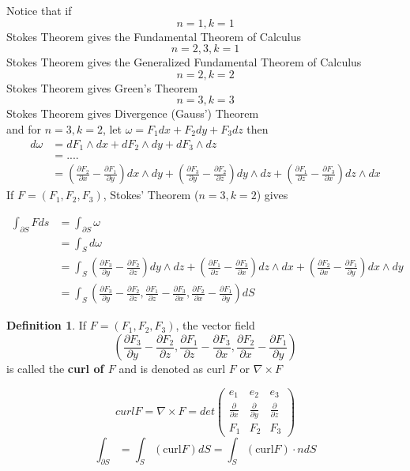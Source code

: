 \documentclass[12pt]{article}
\theoremstyle{plain}
\theoremstyle{definition}
\newtheorem{definition}[theorem]{Definition}
\begin{document}
Notice that if
$$n=1, k=1$$
Stokes Theorem gives the Fundamental Theorem of Calculus
$$n=2,3, k=1$$
Stokes Theorem gives the Generalized Fundamental Theorem of Calculus
$$n = 2, k = 2$$
Stokes Theorem gives Green's Theorem
$$n=3, k=3$$
Stokes Theorem gives Divergence (Gauss') Theorem\\
and for $n=3, k=2$, let $\omega = F_1 dx + F_2 dy + F_3 dz$ then
\begin{align*}
	d\omega &= dF_1 \wedge dx + dF_2 \wedge dy + dF_3 \wedge dz\\
	&= ....\\
	&= (\frac{\partial F_2}{\partial x} - \frac{\partial F_1}{\partial y})dx \wedge dy + (\frac{\partial F_3}{\partial y} - \frac{\partial F_2}{\partial z})dy \wedge dz + (\frac{\partial F_1}{\partial z} - \frac{\partial F_3}{\partial x})dz \wedge dx
\end{align*}
If $F=(F_1, F_2, F_3)$, Stokes' Theorem ($n=3, k=2$) gives

\begin{align*}
	\int_{\partial S} F ds &= \int_{\partial S} \omega\\
	 &= \int_S d\omega\\
	 &= \int_S (\frac{\partial F_3}{\partial y}-\frac{\partial F_2}{\partial z})dy \wedge dz + (\frac{\partial F_1}{\partial z}-\frac{\partial F_3}{\partial x})dz\wedge dx + (\frac{\partial F_2}{\partial x}-\frac{\partial F_1}{\partial y})dx\wedge dy\\
	 &= \int_S (\frac{\partial F_3}{\partial y}-\frac{\partial F_2}{\partial z}, \frac{\partial F_1}{\partial z} - \frac{\partial F_3}{\partial x}, \frac{\partial F_2}{\partial x} - \frac{\partial F_1}{\partial y})dS
\end{align*}

\begin{definition}
	If $F=(F_1, F_2, F_3)$, the vector field
	$$(\frac{\partial F_3}{\partial y}-\frac{\partial F_2}{\partial z}, \frac{\partial F_1}{\partial z} - \frac{\partial F_3}{\partial x}, \frac{\partial F_2}{\partial x} - \frac{\partial F_1}{\partial y})$$
	is called the \textbf{curl of $F$} and is denoted as curl $F$ or $\nabla \times F$
\end{definition}

$$curl F = \nabla \times F = det\begin{pmatrix}
e_1 & e_2 & e_3 \\
\frac{\partial}{\partial x} & \frac{\partial}{\partial y} & \frac{\partial}{\partial z}\\
F_1 & F_2 & F_3
\end{pmatrix}$$
$$\int_{\partial S} = \int_S (\text{curl} F)dS = \int_S (\text{curl} F)\cdot n dS$$
\end{document}
